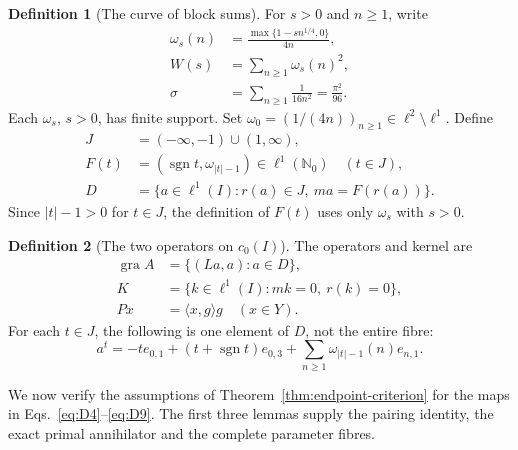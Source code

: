 \documentclass[11pt]{article}
\newcommand{\Nzero}{\mathbb N_0}
\newcommand{\gra}{\operatorname{gra}}
\newcommand{\sgn}{\operatorname{sgn}}
\newcommand{\pair}[2]{\langle #1,#2\rangle}
\theoremstyle{definition}
\newtheorem{definition}{Definition}
\theoremstyle{remark}
\begin{document}
\begin{definition}[The curve of block sums]
For $s>0$ and $n\ge1$, write
\begin{equation}
\begin{aligned}
\omega_s(n)&=\frac{\max\{1-sn^{1/4},0\}}{4n},\\
W(s)&=\sum_{n\ge1}\omega_s(n)^2,\\
\sigma&=\sum_{n\ge1}\frac1{16n^2}=\frac{\pi^2}{96}.
\end{aligned}
\label{eq:D6}
\end{equation}
Each $\omega_s$, $s>0$, has finite support. Set
$\omega_0=(1/(4n))_{n\ge1}\in\ell^2\setminus\ell^1$. Define
\begin{equation}
\begin{aligned}
J&=(-\infty,-1)\cup(1,\infty),\\
F(t)&=(\sgn t,\omega_{|t|-1})\in\ell^1(\Nzero)\quad(t\in J),\\
D&=\{a\in\ell^1(I):r(a)\in J,\ ma=F(r(a))\}.
\end{aligned}
\label{eq:D7}
\end{equation}
Since $|t|-1>0$ for $t\in J$, the definition of $F(t)$ uses only
$\omega_s$ with $s>0$.
\end{definition}

\begin{definition}[The two operators on $c_0(I)$]
The operators and kernel are
\begin{equation}
\begin{aligned}
\gra A&=\{(La,a):a\in D\},\\
K&=\{k\in\ell^1(I):mk=0,\ r(k)=0\},\\
Px&=\pair{x}{g}g\quad(x\in Y).
\end{aligned}
\label{eq:D8}
\end{equation}
For each $t\in J$, the following is one element of $D$, not the entire fibre:
\begin{equation}
a^t=-t e_{0,1}+(t+\sgn t)e_{0,3}
       +\sum_{n\ge1}\omega_{|t|-1}(n)e_{n,1}.
\label{eq:D9}
\end{equation}
\end{definition}

\label{sec:supporting}
We now verify the assumptions of Theorem~\ref{thm:endpoint-criterion}
for the maps in Eqs.~\eqref{eq:D4}--\eqref{eq:D9}. The first three
lemmas supply the pairing identity, the exact primal annihilator and
the complete parameter fibres.
\end{document}
